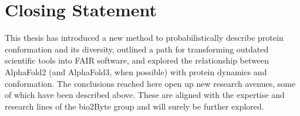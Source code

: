 \section{Closing Statement}

This thesis has introduced a new method to probabilistically describe protein conformation and its diversity, outlined a path for transforming outdated scientific tools into FAIR software, and explored the relationship between AlphaFold2 (and AlphaFold3, when possible) with protein \gls{dynamics} and conformation. The conclusions reached here open up new research avenues, some of which have been described above. These are aligned with the expertise and research lines of the bio2Byte group and will surely be further explored.

